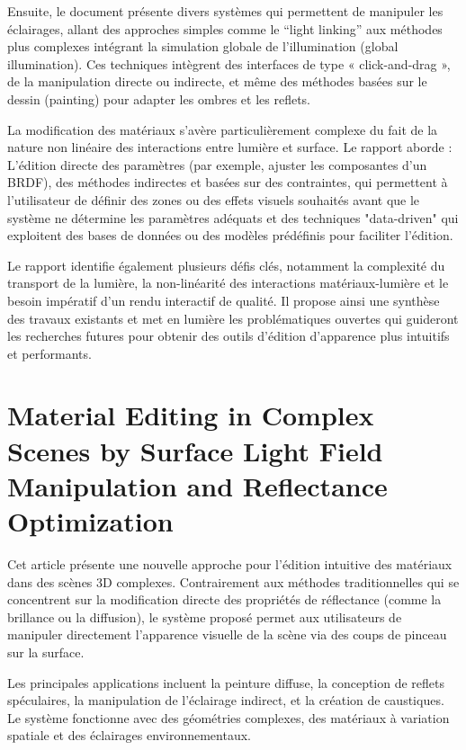 \documentclass{article}
\begin{document}
Ensuite, le document présente divers systèmes qui permettent de manipuler les éclairages, allant des approches simples comme le “light linking” aux 
méthodes plus complexes intégrant la simulation globale de l’illumination (global illumination). Ces techniques intègrent des interfaces 
de type « click-and-drag », de la manipulation directe ou indirecte, et même des méthodes basées sur le dessin (painting) pour adapter les ombres 
et les reflets.

La modification des matériaux s’avère particulièrement complexe du fait de la nature non linéaire des interactions entre lumière et surface. 
Le rapport aborde : L’édition directe des paramètres (par exemple, ajuster les composantes d’un BRDF), des méthodes indirectes et basées sur des 
contraintes, qui permettent à l’utilisateur de définir des zones ou des effets visuels souhaités avant que le système ne détermine les paramètres
adéquats et des techniques "data-driven" qui exploitent des bases de données ou des modèles prédéfinis pour faciliter l’édition.

Le rapport identifie également plusieurs défis clés, notamment la complexité du transport de la lumière, la non-linéarité des interactions 
matériaux-lumière et le besoin impératif d’un rendu interactif de qualité. Il propose ainsi une synthèse des travaux existants et met en lumière
les problématiques ouvertes qui guideront les recherches futures pour obtenir des outils d’édition d’apparence plus intuitifs et performants.

\section{Material Editing in Complex Scenes by Surface Light Field Manipulation and Reflectance Optimization}

Cet article présente une nouvelle approche pour l'édition intuitive des matériaux dans des scènes 3D complexes. Contrairement aux méthodes traditionnelles qui se concentrent sur la modification directe des propriétés de réflectance (comme la brillance ou la diffusion), le système proposé permet aux utilisateurs de manipuler directement l'apparence visuelle de la scène via des coups de pinceau sur la surface.

Les principales applications incluent la peinture diffuse, la conception de reflets spéculaires, la manipulation de l'éclairage indirect, et la création de caustiques. Le système fonctionne avec des géométries complexes, des matériaux à variation spatiale et des éclairages environnementaux.
\end{document}
